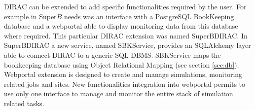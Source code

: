\documentclass[journal]{IEEEtran}
\begin{document}
DIRAC can be extended to add specific functionalities required by the user. For example in Super$B$\cite{ref:superb_tdr} needs was an interface with a PostgreSQL BookKeeping database and a webportal able to display monitoring data from this database where required. This particular DIRAC extension was named SuperBDIRAC.
In SuperBDIRAC a new service, named SBKService, provides an SQLAlchemy layer able to connect DIRAC to a generic SQL DBMS. SBKService maps the bookkeeping database using Object Relational Mapping (see section \ref{sec:db}). 
Webportal extension is designed to create and manage simulations, monitoring related jobs and sites. New functionalities integration into webportal permits to use only one interface to manage and monitor the entire stack of simulation related tasks.


%
%


\end{document}
